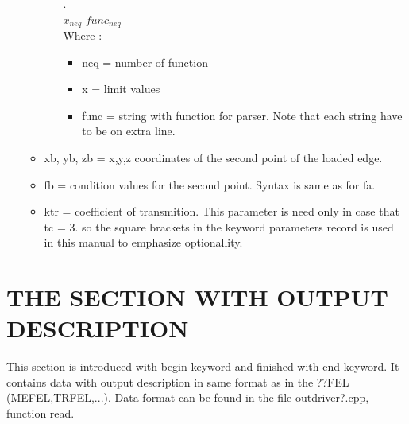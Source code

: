 \documentclass[12pt]{book}
\begin{document}
\begin{itemize}
\begin{itemize}
\begin{itemize}
                           .\\
                          $x_{neq}$ $func_{neq}$\\
                 Where :
                 \begin{itemize}
                 \item neq = number of function
                 \item x   = limit values
                 \item func = string with function for parser. Note that each string
                        have to be on extra line.
                 \end{itemize}
                \end{itemize}%
           \item xb, yb, zb = x,y,z coordinates of the second point of the loaded edge.
           \item fb  = condition values for the second point. Syntax is same as for fa.
           \item ktr = coefficient of transmition. This parameter is need only
                 in case that tc = 3. so the square brackets in the
                 keyword parameters record is used in this manual to emphasize
                 optionallity.
          \end{itemize}%
\end{itemize}%

\section{THE SECTION WITH OUTPUT DESCRIPTION}
This section is introduced with begin keyword and finished with end keyword.
It contains data with output description in same format as in the ??FEL
(MEFEL,TRFEL,...). Data format can be found in the file outdriver?.cpp, function
read.
\end{document}

